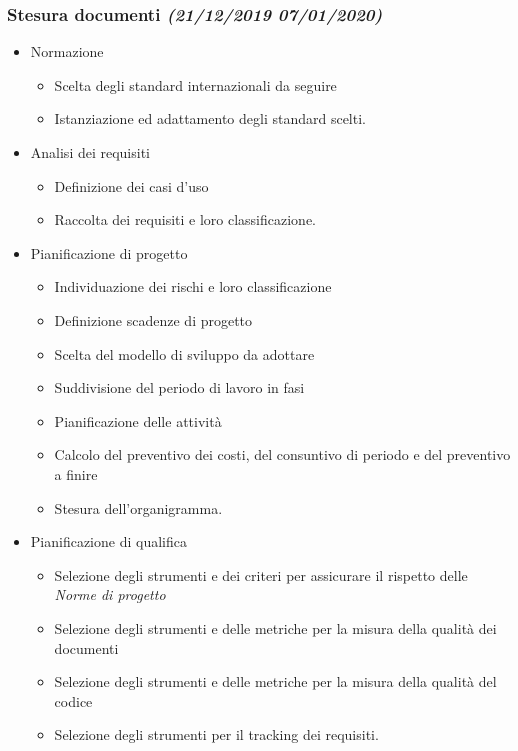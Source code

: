 \documentclass[../piano-di-progetto.tex]{subfiles}
\begin{document}
\subsubsection[Analisi e pianificazione]{Stesura documenti {\normalsize\normalfont\itshape(21/12/2019  07/01/2020)}}%
\label{subs:analisi_e_pianificazione}
\begin{itemize}
  \item Normazione
  \begin{itemize}
    \item Scelta degli standard internazionali da seguire
    \item Istanziazione ed adattamento degli standard scelti.
  \end{itemize}
  \item Analisi dei requisiti
  \begin{itemize}
    \item Definizione dei casi d'uso
    \item Raccolta dei requisiti e loro classificazione.
  \end{itemize}
  \item Pianificazione di progetto
  \begin{itemize}
    \item Individuazione dei rischi e loro classificazione
    \item Definizione scadenze di progetto
    \item Scelta del modello di sviluppo da adottare
    \item Suddivisione del periodo di lavoro in fasi
    \item Pianificazione delle attività
    \item Calcolo del preventivo dei costi, del consuntivo di periodo e del preventivo a finire
    \item Stesura dell'organigramma.
  \end{itemize}
  \item Pianificazione di qualifica
  \begin{itemize}
    \item Selezione degli strumenti e dei criteri per assicurare il rispetto delle \textit{Norme di progetto}
    \item Selezione degli strumenti e delle metriche per la misura della qualità dei documenti
    \item Selezione degli strumenti e delle metriche per la misura della qualità del codice
    \item Selezione degli strumenti per il tracking dei requisiti.

\end{itemize}
\end{itemize}
\end{document}
